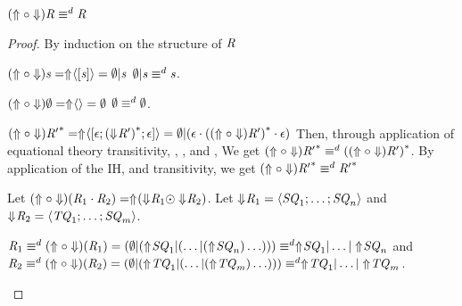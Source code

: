 \documentclass[numbers,10pt,preprint\ifanon ,nocopyrightspace\fi]{sigplanconf}
\begin{document}
\begin{lemma}
  \label{lem:there-and-back-equiv}
  $(\Uparrow \circ \Downarrow) \mathit{R} \equiv^d \mathit{R}$
\end{lemma}
\begin{proof}
  By induction on the structure of $\mathit{R}$
  \begin{case}[\BaseRegexType{}]
    $(\Uparrow \circ \Downarrow)\mathit{s} =
    \Uparrow\mkern-4mu \langle[\mathit{s}]\rangle = \emptyset | \mathit{s}$
    $\emptyset | \mathit{s} \equiv^d \mathit{s}$.
  \end{case}

  \begin{case}[\EmptyRegexType{}]
    $(\Uparrow \circ \Downarrow)\emptyset =
    \Uparrow\mkern-4mu \langle\rangle = \emptyset$
    $\emptyset \equiv^d \emptyset$.
  \end{case}

  \begin{case}[\StarRegexType{}]
    $(\Uparrow \circ \Downarrow){\mathit{R}'}^* =
    \Uparrow\mkern-4mu \langle[\epsilon;{(\Downarrow\mkern-4mu \mathit{R}')}^*;\epsilon]\rangle
    = \emptyset | (\epsilon \cdot {((\ensuremath{\Uparrow}\ensuremath{\circ}\ensuremath{\Downarrow})\ensuremath{\mathit{R}}')}^*
    \cdot \epsilon)$
    Then, through application of equational theory transitivity,
    \OrIdentityRule{}, \ConcatIdentityLeftRule{}, and \ConcatIdentityRightRule{},
    We get $(\Uparrow \circ \Downarrow){\mathit{R}'}^* \equiv^d
    {((\Uparrow \circ \Downarrow)\mathit{R}')}^*$.
    By application of the IH, and transitivity, we get
    $(\Uparrow \circ \Downarrow){\mathit{R}'}^* \equiv^d
    {\mathit{R}'}^*$
  \end{case}

  \begin{case}[\ConcatRegexType{}]
    Let $(\Uparrow \circ \Downarrow)(\mathit{R}_1 \cdot \mathit{R}_2) =
    \Uparrow\mkern-4mu (\Downarrow\mkern-4mu \mathit{R}_1 \odot \Downarrow\mkern-4mu \mathit{R}_2)$.
    Let $\Downarrow\mkern-4mu \mathit{R}_1 = \langle\mathit{SQ}_1;\ldots;\mathit{SQ}_n\rangle$ and
    $\Downarrow\mkern-4mu \mathit{R}_2 = \langle\mathit{TQ}_1;\ldots;\mathit{SQ}_m\rangle$.

    $\mathit{R}_1 \equiv^d (\Uparrow \circ \Downarrow)(\mathit{R}_1) =
    (\emptyset | (\Uparrow\mkern-4mu \mathit{SQ}_1 | (\ldots |
    (\Uparrow\mkern-4mu \mathit{SQ}_n)\ldots))) \equiv^d
    \Uparrow\mkern-4mu \mathit{SQ}_1 | \ldots | \Uparrow\mkern-4mu \mathit{SQ}_n$
    and
    $\mathit{R}_2 \equiv^d (\Uparrow \circ \Downarrow)(\mathit{R}_2) =
    (\emptyset | (\Uparrow\mkern-4mu \mathit{TQ}_1 | (\ldots |
    (\Uparrow\mkern-4mu \mathit{TQ}_m)\ldots))) \equiv^d
    \Uparrow\mkern-4mu \mathit{TQ}_1 | \ldots | \Uparrow\mkern-4mu \mathit{TQ}_m$.


\end{case}
\end{proof}
\end{document}
